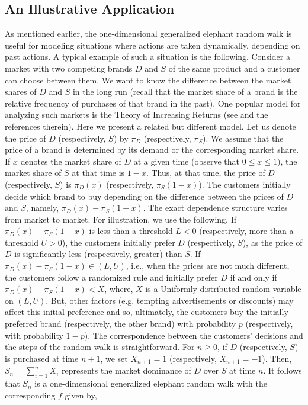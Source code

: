 \documentclass[12pt]{amsart}
\theoremstyle{plain}
\theoremstyle{remark}
\numberwithin{equation}{section}
\begin{document}
\subsection{An Illustrative Application}\label{subsec:econ-ldrw}

As mentioned earlier, the one-dimensional generalized elephant random walk is useful for modeling situations where actions are taken dynamically, depending on past actions. A typical example of such a situation is the following. Consider a market with two competing brands $D$ and $S$ of the same product and a customer can choose between them. We want to know the difference between the market shares of $D$ and $S$ in the long run (recall that the market share of a brand is the relative frequency of purchases of that brand in the past). {One popular model for analyzing such markets is the Theory of Increasing Returns (see \cite{ldpir} and the references therein). %
Here we present a related but different model.} Let us denote the price of $D$ (respectively, $S$) by $\pi_D$ (respectively, $\pi_S$). We assume that the price of a brand is determined by its demand or the corresponding market share. %
If $x$ denotes the market share of $D$ at a given time (observe that $0 \leq x \leq 1)$, the market share of $S$ at that time is $1-x$. Thus, at that time, the price of $D$ (respectively, $S$) is $\pi_D(x)$ (respectively, $\pi_S(1-x)$). The customers initially decide which brand to buy depending on the difference between the prices of $D$ and $S$, namely, $\pi_D(x) - \pi_S(1-x)$. The exact dependence structure varies from market to market. For illustration, we use the following. If $\pi_D(x) - \pi_S(1-x)$ is less than a threshold $L < 0$ (respectively, more than a threshold $U > 0$), the customers initially prefer $D$ (respectively, $S$), as the price of $D$ is significantly less (respectively, greater) than $S$. If $\pi_D(x) - \pi_S(1-x) \in (L, U)$, i.e., when the prices are not much different, the customers follow a randomized rule and initially prefer $D$ if and only if $\pi_D(x) - \pi_S(1-x) < X$, where, $X$ is a Uniformly distributed random variable on $(L, U)$. But, other factors (e.g. tempting advertisements or discounts) may affect this initial preference and so, ultimately, the customers buy the initially preferred brand (respectively, the other brand) with probability $p$ (respectively, with probability $1-p$). The correspondence between the customers' decisions and the steps of the random walk is straightforward. For $n \geq 0$, if $D$ (respectively, $S$) is purchased at time $n+1$, we set $X_{n+1} = 1$ (respectively, $X_{n+1} = -1$). Then, $S_n = \sum_{i=1}^n X_i$ represents the market dominance of $D$ over $S$ at time $n$. It follows that $S_n$ is a one-dimensional generalized elephant random walk with the corresponding $f$ given by,
\end{document}
